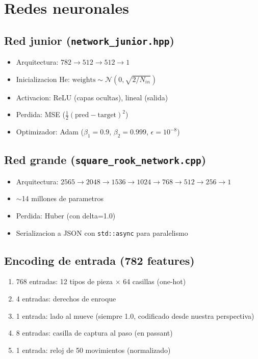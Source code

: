 \documentclass[11pt,a4paper]{article}
\begin{document}
\section{Redes neuronales}

\subsection*{Red junior (\texttt{network\_junior.hpp})}
\begin{itemize}
  \item Arquitectura: $782 \to 512 \to 512 \to 1$
  \item Inicializacion He: $\text{weights} \sim \mathcal{N}(0, \sqrt{2/N_{in}})$
  \item Activacion: ReLU (capas ocultas), lineal (salida)
  \item Perdida: MSE ($\frac{1}{2}(\text{pred} - \text{target})^2$)
  \item Optimizador: Adam ($\beta_1=0.9$, $\beta_2=0.999$, $\epsilon=10^{-8}$)
\end{itemize}

\subsection*{Red grande (\texttt{square\_rook\_network.cpp})}
\begin{itemize}
  \item Arquitectura: $2565 \to 2048 \to 1536 \to 1024 \to 768 \to 512 \to 256 \to 1$
  \item $\sim$14 millones de parametros
  \item Perdida: Huber (con delta=1.0)
  \item Serializacion a JSON con \texttt{std::async} para paralelismo
\end{itemize}

\subsection*{Encoding de entrada (782 features)}
\begin{enumerate}
  \item 768 entradas: 12 tipos de pieza $\times$ 64 casillas (one-hot)
  \item 4 entradas: derechos de enroque
  \item 1 entrada: lado al mueve (siempre 1.0, codificado desde nuestra perspectiva)
  \item 8 entradas: casilla de captura al paso (en passant)
  \item 1 entrada: reloj de 50 movimientos (normalizado)
\end{enumerate}
\end{document}
